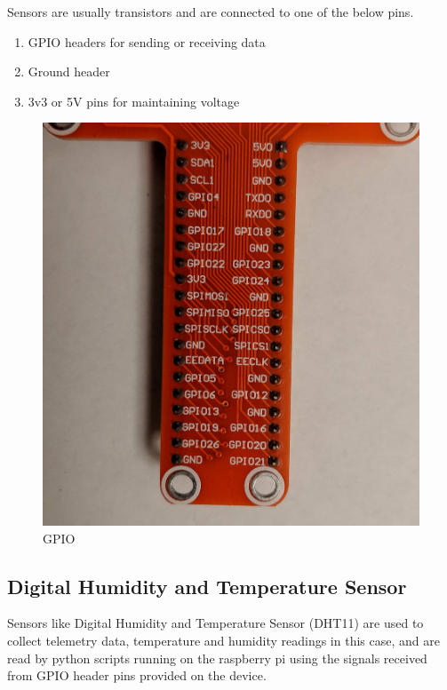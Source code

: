 \documentclass[11pt,openright]{report}
\begin{document}
Sensors are usually transistors and are connected to one of the below pins.
\begin{enumerate}
\item GPIO headers for sending or receiving data
\item  Ground header 
\item  3v3 or 5V pins for maintaining voltage
\end{enumerate}

\begin{figure}
    \centering
    \includegraphics[scale=0.1]{images/gpiopins.jpg}
    \caption{GPIO}
    \label{fig:gpio_pins}
\end{figure}

\subsection{Digital Humidity and Temperature Sensor}
Sensors like Digital Humidity and Temperature Sensor (DHT11) are used to collect telemetry data, temperature and humidity readings in this case, and are read by python scripts running on the raspberry pi using the signals received from GPIO header pins provided on the device.
\end{document}
